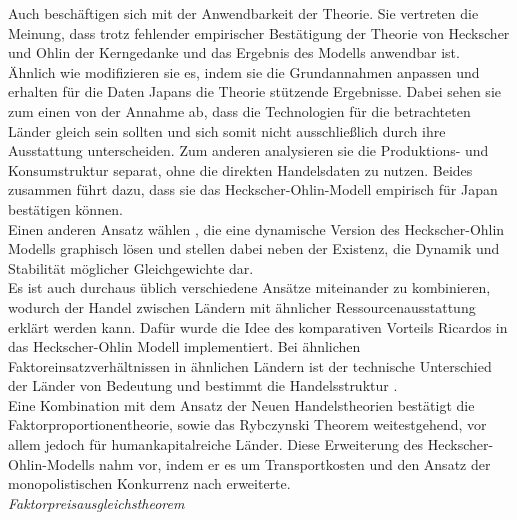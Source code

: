 Auch \citet{Davis.1995} besch{\"a}ftigen sich mit der Anwendbarkeit der Theorie. Sie vertreten die Meinung, dass trotz fehlender empirischer Best{\"a}tigung der Theorie von Heckscher und Ohlin der Kerngedanke und das Ergebnis des Modells anwendbar ist. {\"A}hnlich wie \citet{Trefler.1993} modifizieren sie es, indem sie die Grundannahmen anpassen und erhalten f{\"u}r die Daten Japans die Theorie st{\"u}tzende Ergebnisse. Dabei sehen sie zum einen von der Annahme ab, dass die Technologien f{\"u}r die betrachteten L{\"a}nder gleich sein sollten und sich somit nicht ausschlie{\ss}lich durch ihre Ausstattung unterscheiden. Zum anderen analysieren sie die Produktions- und Konsumstruktur separat, ohne die direkten Handelsdaten zu nutzen.  Beides zusammen f{\"u}hrt dazu, dass sie das Heckscher-Ohlin-Modell empirisch f{\"u}r Japan best{\"a}tigen k{\"o}nnen.\\


Einen anderen Ansatz w{\"a}hlen \citet{Bond.}, die eine dynamische Version des Heckscher-Ohlin Modells graphisch l{\"o}sen und stellen dabei neben der Existenz, die Dynamik und Stabilit{\"a}t m{\"o}glicher Gleichgewichte dar.\\
Es ist auch durchaus üblich verschiedene Ansätze miteinander zu kombinieren, wodurch der Handel zwischen L{\"a}ndern mit {\"a}hnlicher Ressourcenausstattung erklärt werden kann. Daf{\"u}r wurde die Idee des komparativen Vorteils Ricardos in das Heckscher-Ohlin Modell implementiert. Bei {\"a}hnlichen Faktoreinsatzverh{\"a}ltnissen in {\"a}hnlichen L{\"a}ndern ist der technische Unterschied der L{\"a}nder von Bedeutung und bestimmt die Handelsstruktur \citep{Davis.1995b}.\\
Eine Kombination mit dem Ansatz der Neuen Handelstheorien best{\"a}tigt die Faktorproportionentheorie, sowie das Rybczynski Theorem weitestgehend, vor allem jedoch f{\"u}r humankapitalreiche L{\"a}nder. Diese Erweiterung des Heckscher-Ohlin-Modells nahm \citet{Romalis.2004} vor, indem er es um Transportkosten und den Ansatz der monopolistischen Konkurrenz nach \citet{Krugman.1980} erweiterte.\\


\textit{Faktorpreisausgleichstheorem}\\


